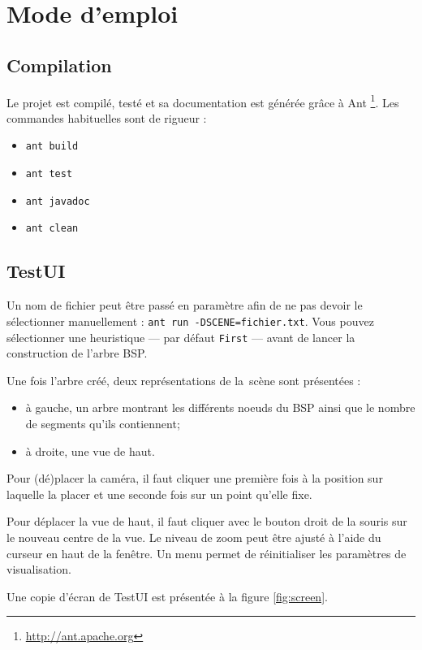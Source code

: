 \documentclass[12pt,twocolumn]{article}
\begin{document}
\section{Mode d'emploi}
\subsection{Compilation}
Le projet est compilé, testé et sa documentation est générée grâce à Ant
\footnote{\url{http://ant.apache.org}}.
Les commandes habituelles sont de rigueur :
\begin{itemize}
	\item \texttt{ant build}
	\item \texttt{ant test}
	\item \texttt{ant javadoc}
	\item \texttt{ant clean}
\end{itemize}


\subsection{TestUI}
Un nom de fichier peut être passé en paramètre afin de ne pas devoir le
sélectionner manuellement : \texttt{ant run -DSCENE=fichier.txt}.
Vous pouvez sélectionner une heuristique --- par défaut \texttt{First} ---
avant de lancer la construction de l'arbre BSP.

Une fois l'arbre créé, deux représentations de la~scène sont présentées :
\begin{itemize}
\item à gauche, un arbre montrant les différents noeuds du BSP ainsi
	que le nombre de segments qu'ils contiennent;
\item à droite, une vue de haut.
\end{itemize}

Pour (dé)placer la caméra, il faut cliquer une première fois à la position sur
laquelle la placer et une seconde fois sur un point qu'elle fixe.

Pour déplacer la vue de haut, il faut cliquer avec le bouton droit de la souris
sur le nouveau centre de la vue. Le niveau de zoom peut être ajusté à l'aide du
curseur en haut de la fenêtre. Un menu permet de réinitialiser
les paramètres de visualisation.

Une copie d'écran de TestUI est présentée à la figure \ref{fig:screen}.
\end{document}
